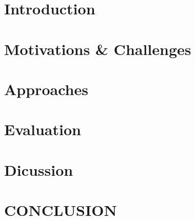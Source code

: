 

\section{Introduction}
    \label{sec:intro}
    
    
\section{Motivations \& Challenges}
    \label{sec:movi}
    

\section{Approaches}
    \label{sec:approaches}
    

\section{Evaluation}
    \label{sec:evaluation}
    

\section{Dicussion}
    \label{sec:risk}
    
    
\section{CONCLUSION}
    \label{sec:conclusion}
    